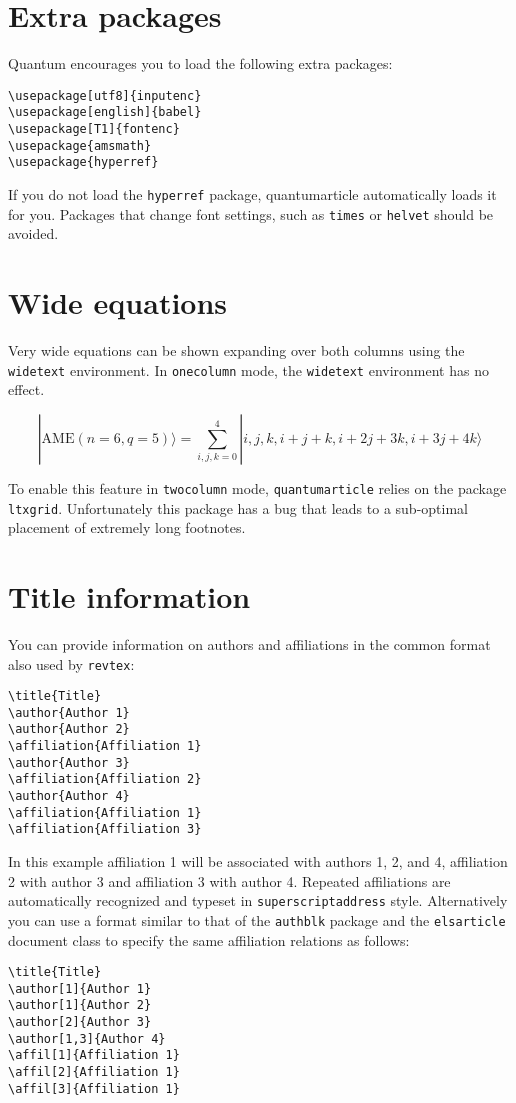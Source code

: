 \documentclass[a4paper,twocolumn,11pt,accepted=2017-05-09]{quantumarticle}
\begin{document}
\section{Extra packages}
Quantum encourages you to load the following extra packages:
\begin{verbatim}
\usepackage[utf8]{inputenc}
\usepackage[english]{babel}
\usepackage[T1]{fontenc}
\usepackage{amsmath}
\usepackage{hyperref}
\end{verbatim}
If you do not load the \texttt{hyperref} package, quantumarticle automatically loads it for you.
Packages that change font settings, such as \texttt{times} or \texttt{helvet} should be avoided.

\section{Wide equations}
Very wide equations can be shown expanding over both columns using the \texttt{widetext} environment.
In \texttt{onecolumn} mode, the \texttt{widetext} environment has no effect.
\begin{widetext}
  \begin{equation}
|\mathrm{AME}(n=6,q=5)\rangle=\sum_{i,j,k=0}^4 |i,j,k,i+j+k,i+2j+3k,i+3j+4k\rangle
  \end{equation}
\end{widetext}
To enable this feature in \texttt{twocolumn} mode, \texttt{quantumarticle} relies on the package \texttt{ltxgrid}.
Unfortunately this package has a bug that leads to a sub-optimal placement of extremely long footnotes.

\section{Title information}
\label{sec:title-information}
You can provide information on authors and affiliations in the common format also used by \texttt{revtex}:
\begin{verbatim}
\title{Title}
\author{Author 1}
\author{Author 2}
\affiliation{Affiliation 1}
\author{Author 3}
\affiliation{Affiliation 2}
\author{Author 4}
\affiliation{Affiliation 1}
\affiliation{Affiliation 3}
\end{verbatim}
In this example affiliation 1 will be associated with authors 1, 2, and 4, affiliation 2 with author 3 and affiliation 3 with author 4.
Repeated affiliations are automatically recognized and typeset in \texttt{superscriptaddress} style.
Alternatively you can use a format similar to that of the \texttt{authblk} package and the \texttt{elsarticle} document class to specify the same affiliation relations as follows:
\begin{verbatim}
\title{Title}
\author[1]{Author 1}
\author[1]{Author 2}
\author[2]{Author 3}
\author[1,3]{Author 4}
\affil[1]{Affiliation 1}
\affil[2]{Affiliation 1}
\affil[3]{Affiliation 1}
\end{verbatim}
\end{document}
